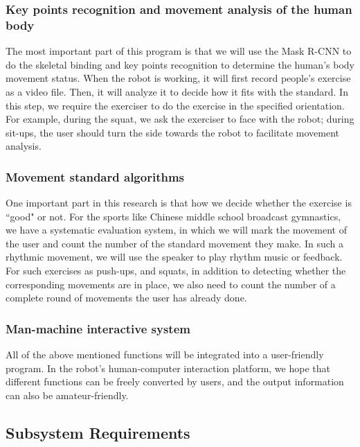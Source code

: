 \subsubsection{Key points recognition and movement analysis of the human body}
The most important part of this program is that we will use the Mask R-CNN to do the skeletal binding and key points recognition to determine the human’s body movement status. When the robot is working, it will first record people's exercise as a video file. Then, it will analyze it to decide how it fits with the standard. In this step, we require the exerciser to do the exercise in the specified orientation. For example, during the squat, we ask the exerciser to face with the robot; during sit-ups, the user should turn the side towards the robot to facilitate movement analysis. 
\subsubsection{Movement standard algorithms}
One important part in this research is that how we decide whether the exercise is ``good" or not. For the sports like Chinese middle school broadcast gymnastics, we have a systematic evaluation system, in which we will mark the movement of the user and count the number of the standard movement they make. In such a rhythmic movement, we will use the speaker to play rhythm music or feedback. For such exercises as push-ups, and squats, in addition to detecting whether the corresponding movements are in place, we also need to count the number of a complete round of movements the user has already done.
\subsubsection{Man-machine interactive system}
All of the above mentioned functions will be integrated into a user-friendly program. In the robot's human-computer interaction platform, we hope that different functions can be freely converted by users, and the output information can also be amateur-friendly.


\newpage
\subsection{Subsystem Requirements}
